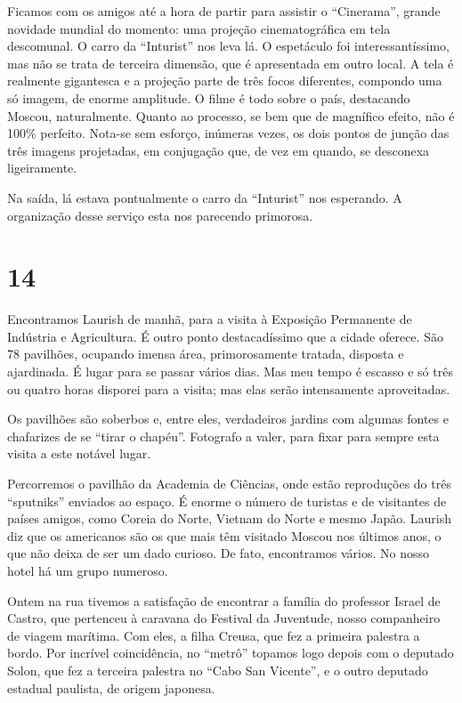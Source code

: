 Ficamos com os amigos até a hora de partir para assistir o “Cinerama”, grande novidade mundial do momento: uma projeção cinematográfica em tela descomunal. O carro da “Inturist” nos leva lá. O espetáculo foi interessantíssimo, mas não se trata de terceira dimensão, que é apresentada em outro local. A tela é realmente gigantesca e a projeção parte de três focos diferentes, compondo uma só imagem, de enorme amplitude. O filme é todo sobre o país, destacando Moscou, naturalmente. Quanto ao processo, se bem que de magnífico efeito, não é 100\% perfeito. Nota-se sem esforço, inúmeras vezes, os dois pontos de junção das três imagens projetadas, em conjugação que, de vez em quando, se desconexa ligeiramente.

Na saída, lá estava pontualmente o carro da “Inturist” nos esperando. A organização desse serviço esta nos parecendo primorosa.

\section*{14 \adfflatleafright {}}
Encontramos Laurish de manhã, para a visita à Exposição Permanente de Indústria e Agricultura. É outro ponto destacadíssimo que a cidade oferece. São 78 pavilhões, ocupando imensa área, primorosamente tratada, disposta e ajardinada. É lugar para se passar vários dias. Mas meu tempo é escasso e só três ou quatro horas disporei para a visita; mas elas serão intensamente aproveitadas.

Os pavilhões são soberbos e, entre eles, verdadeiros jardins com algumas fontes e chafarizes de se “tirar o chapéu”. Fotografo a valer, para fixar para sempre esta visita a este notável lugar.

Percorremos o pavilhão da Academia de Ciências, onde estão reproduções do três “sputniks” enviados ao espaço. É enorme o número de turistas e de visitantes de países amigos, como Coreia do Norte, Vietnam do Norte e mesmo Japão. Laurish diz que os americanos são os que mais têm visitado Moscou nos últimos anos, o que não deixa de ser um dado curioso. De fato, encontramos vários. No nosso hotel há um grupo numeroso.

Ontem na rua tivemos a satisfação de encontrar a família do professor Israel de Castro, que pertenceu à caravana do Festival da Juventude, nosso companheiro de viagem marítima. Com eles, a filha Creusa, que fez a primeira palestra a bordo. Por incrível coincidência, no “metrô” topamos logo depois com o deputado Solon, que fez a terceira palestra no “Cabo San Vicente”, e o outro deputado estadual paulista, de origem japonesa.

